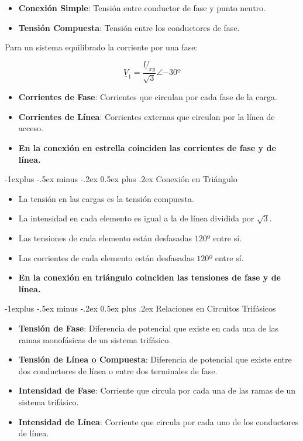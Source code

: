\documentclass[10pt,landscape]{article}
\makeatletter
\renewcommand{\subsection}{\@startsection{subsection}{2}{0mm}%
                                {-1explus -.5ex minus -.2ex}%
                                {0.5ex plus .2ex}%
                                {\normalfont\normalsize\bfseries}}
\makeatother
\begin{document}
\begin{multicols}{3}
\begin{itemize}
	\item \textbf{Conexión Simple}: Tensión entre conductor de fase y punto neutro.
	\item \textbf{Tensión Compuesta}: Tensión entre los conductores de fase.
\end{itemize}

Para un sistema equilibrado la corriente por una fase:

\begin{equation*}
	\underline{V}_1 = \frac{\underline{U}_{xy}}{\sqrt{3}} \angle{-30º}
\end{equation*}

\begin{itemize}
	\item \textbf{Corrientes de Fase}: Corrientes que circulan por cada fase de la carga.
	\item \textbf{Corrientes de Línea}: Corrientes externas que circulan por la línea de acceso.
	\item \textbf{En la conexión en estrella coinciden las corrientes de fase y de línea.}
\end{itemize}

\subsection{Conexión en Triángulo}

\begin{itemize}
	\item La tensión en las cargas es la tensión compuesta.
	\item La intensidad en cada elemento es igual a la de línea dividida por $\sqrt{3}$.
	\item Las tensiones de cada elemento están desfasadas $120º$ entre sí.
	\item Las corrientes de cada elemento están desfasadas $120º$ entre sí.
	\item \textbf{En la conexión en triángulo coinciden las tensiones de fase y de línea.}
\end{itemize}

\subsection{Relaciones en Circuitos Trifásicos}

\begin{itemize}
	\item \textbf{Tensión de Fase}: Diferencia de potencial que existe en cada una de las ramas monofásicas de un sistema trifásico.
	\item \textbf{Tensión de Línea o Compuesta}: Diferencia de potencial que existe entre dos conductores de línea o entre dos terminales de fase.
	\item \textbf{Intensidad de Fase}: Corriente que circula por cada una de las ramas de un sistema trifásico.
	\item \textbf{Intensidad de Línea}: Corriente que circula por cada uno de los conductores de línea.
\end{itemize}


\end{multicols}
\end{document}
